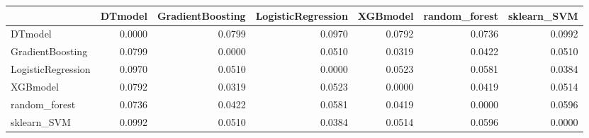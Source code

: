 \begin{tabular}{lrrrrrr}
\toprule
 & DTmodel & GradientBoosting & LogisticRegression & XGBmodel & random_forest & sklearn_SVM \\
\midrule
DTmodel & 0.0000 & 0.0799 & 0.0970 & 0.0792 & 0.0736 & 0.0992 \\
GradientBoosting & 0.0799 & 0.0000 & 0.0510 & 0.0319 & 0.0422 & 0.0510 \\
LogisticRegression & 0.0970 & 0.0510 & 0.0000 & 0.0523 & 0.0581 & 0.0384 \\
XGBmodel & 0.0792 & 0.0319 & 0.0523 & 0.0000 & 0.0419 & 0.0514 \\
random_forest & 0.0736 & 0.0422 & 0.0581 & 0.0419 & 0.0000 & 0.0596 \\
sklearn_SVM & 0.0992 & 0.0510 & 0.0384 & 0.0514 & 0.0596 & 0.0000 \\
\bottomrule
\end{tabular}
